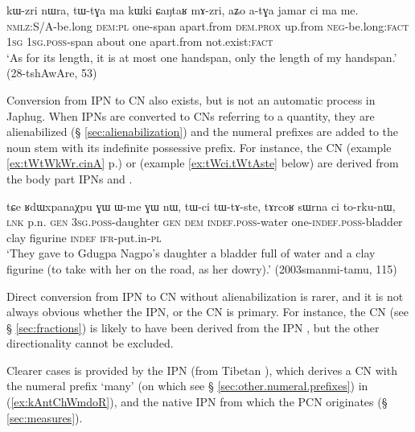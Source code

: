 \begin{exe}
\ex \label{ex:aZo.atGa}
\gll kɯ-zri nɯra, tɯ-tɣa ma kɯki ɕaŋtaʁ mɤ-zri, aʑo a-tɣa jamar ci ma me. \\
 \textsc{nmlz}:S/A-be.long \textsc{dem}:\textsc{pl} one-span apart.from \textsc{dem}.\textsc{prox} up.from \textsc{neg}-be.long:\textsc{fact} \textsc{1sg} \textsc{1sg}.\textsc{poss}-span about one apart.from not.exist:\textsc{fact} \\
\glt `As for its length, it is at most one handspan, only the length of my handspan.' (28-tshAwAre, 53)
\end{exe}

Conversion from IPN to CN also exists, but is not an automatic process in Japhug. When IPNs are converted to CNs referring to a quantity, they are alienabilized (§ \ref{sec:alienabilization}) and the numeral prefixes are added to the noun stem with its indefinite possessive prefix. For instance, the CN  (example \ref{ex:tWtWkWr.cinA} p.\pageref{ex:tWtWkWr.cinA}) or  (example \ref{ex:tWci.tWtAste} below) are derived from the body part IPNs  and . 

\begin{exe}
\ex \label{ex:tWci.tWtAste}
\gll  tɕe ʁdɯxpanaχpu ɣɯ ɯ-me ɣɯ nɯ, tɯ-ci tɯ-tɤ-ste, tɤrcoʁ sɯrna ci to-rku-nɯ, \\
 \textsc{lnk} p.n. \textsc{gen} \textsc{3sg}.\textsc{poss}-daughter \textsc{gen} \textsc{dem} \textsc{indef}.\textsc{poss}-water one-\textsc{indef}.\textsc{poss}-bladder clay figurine \textsc{indef} \textsc{ifr}-put.in-\textsc{pl} \\
\glt `They gave to Gdugpa Nagpo's daughter a bladder full of water and a clay figurine (to take with her on the road, as her dowry).' (2003smanmi-tamu, 115)
\end{exe}

Direct conversion from IPN to CN without alienabilization is rarer, and it is not always obvious whether the IPN, or the CN is primary. For instance, the CN  (see § \ref{sec:fractions}) is likely to have been derived from the IPN , but the other directionality cannot be excluded. 

Clearer cases is provided by the IPN   (from Tibetan ), which derives a CN with the numeral prefix  `many' (on which see § \ref{sec:other.numeral.prefixes}) in (\ref{ex:kAntChWmdoR}), and the native IPN  from which the PCN  originates (§ \ref{sec:measures}).

